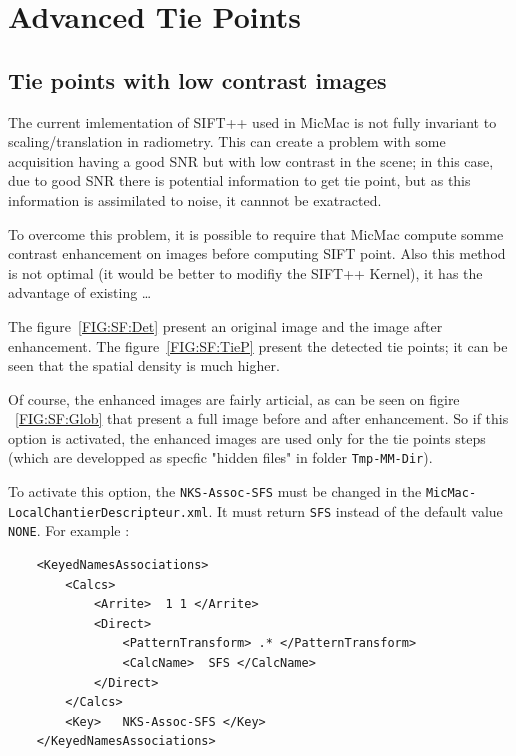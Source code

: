 \chapter{Advanced Tie Points}



\section{Tie points with low contrast images}


The current imlementation of SIFT++ used in MicMac is not fully invariant to scaling/translation in radiometry. This can create a problem with some acquisition having a good SNR but with low contrast  in the scene; in this case, due to good SNR there is potential information to get tie point, but as this information is assimilated to noise, it cannnot be exatracted.

To overcome this problem, it is possible to require that MicMac compute somme contrast enhancement on images before computing SIFT point. Also this method is not optimal (it would be better to modifiy the SIFT++ Kernel), it has the advantage of existing \dots



The figure~\ref{FIG:SF:Det} present an original image and the image after enhancement. The figure~\ref{FIG:SF:TieP} present the detected tie points; it can be seen that the spatial density is much higher.

Of course, the enhanced images are fairly articial, as can be seen on figire ~\ref{FIG:SF:Glob} that present a full image before and after enhancement. So if this option is activated, the enhanced images are used only for the tie points steps (which are developped as specfic "hidden files" in folder {\tt Tmp-MM-Dir}).


To activate this option, the {\tt NKS-Assoc-SFS} must be changed in the {\tt MicMac-LocalChantierDescripteur.xml}. It must return {\tt SFS} instead of the default value {\tt NONE}. For example :

\begin{verbatim}
    <KeyedNamesAssociations>
        <Calcs>
            <Arrite>  1 1 </Arrite>
            <Direct>
                <PatternTransform> .* </PatternTransform>
                <CalcName>  SFS </CalcName>
            </Direct>
        </Calcs>
        <Key>   NKS-Assoc-SFS </Key>
    </KeyedNamesAssociations>
\end{verbatim}

